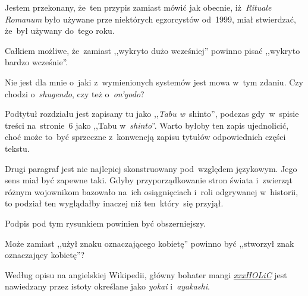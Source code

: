 \documentclass[a4paper,11pt]{article}
\begin{document}
\vspace{\spaceFour}


\start {} Jestem przekonany, że~ten przypis
zamiast mówić jak obecnie, iż~\emph{Rituale Romanum} było używane prze
niektórych egzorcystów od~1999, miał stwierdzać, że~był używany
do~tego roku.

\vspace{\spaceFour}


\start {} Całkiem możliwe, że~zamiast ,,wykryto dużo
wcześniej'' powinno pisać ,,wykryto bardzo wcześnie''.

\vspace{\spaceFour}


\start {} Nie jest dla mnie o~jaki z~wymienionych systemów
jest mowa w~tym zdaniu. Czy chodzi o~\emph{shugendo}, %
czy też o~\emph{on'yodo}? %

\vspace{\spaceFour}


\start {} Podtytuł rozdziału jest zapisany tu jako ,,\emph{Tabu
  w}~shinto'', %
podczas gdy~w~spisie treści na~stronie~6 jako ,,Tabu
w~\emph{shinto}''. %
Warto byłoby ten zapis ujednolicić, choć może to~być sprzeczne
z~konwencją zapisu tytułów odpowiednich części tekstu.

\vspace{\spaceFour}


\start {} Drugi paragraf jest nie najlepiej skonstruowany
pod~względem językowym. Jego sens miał być zapewne taki. Gdyby
przyporządkowanie stron świata i~zwierząt różnym wojownikom bazowało
na~ich osiągnięciach i~roli odgrywanej w~historii, to podział ten
wyglądałby inaczej niż ten~który~się przyjął.

\vspace{\spaceFour}


\start {} Podpis pod tym rysunkiem powinien być obszerniejszy.

\vspace{\spaceFour}


\start {} Może zamiast ,,użył znaku oznaczającego
kobietę'' powinno być ,,stworzył znak oznaczający kobietę''?

\vspace{\spaceFour}


\start {} Według opisu na angielskiej Wikipedii, główny
bohater mangi
\href{https://en.wikipedia.org/wiki/XxxHolic}{\emph{xxxHOLiC}} jest
nawiedzany przez istoty określane jako \emph{yokai}
i~\emph{ayakashi}.
\end{document}
